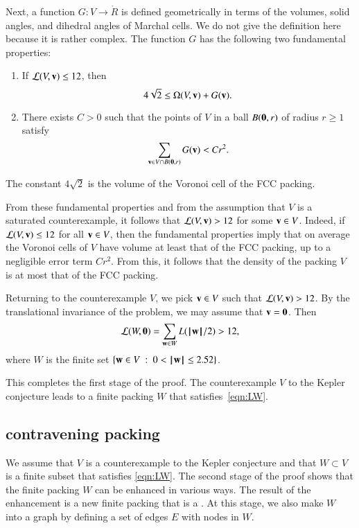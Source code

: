 Next, a function $G:V\to \ring{R}$ is defined geometrically in terms
of the volumes, solid angles, and dihedral angles of Marchal cells.
We do not give the definition here because it is rather
complex.  The function $G$ has the following two fundamental
properties:
\begin{enumerate}
\item If ${\mathcal L}(V,{\mathbf v})\le 12$, then 
\[
4\sqrt{2}\le \Omega(V,{\mathbf v}) +G({\mathbf v}).
\]
\item There exists $C>0$ such that the points of $V$ in a ball $B({\mathbf 0},r)$
of radius $r\ge 1$ satisfy
\[
\sum_{{\mathbf v}\in V \cap B({\mathbf 0},r)} G({\mathbf v}) < C r^2.
\]
\end{enumerate}
The constant $4\sqrt{2}$ is the volume of the Voronoi cell of the FCC packing.

From these fundamental properties and from the assumption that $V$ is a saturated counterexample,
it follows that ${\mathcal L}(V,{\mathbf v})>12$ for some ${\mathbf v}\in V$.  Indeed, if ${\mathcal L}(V,{\mathbf v})\le 12$ for all
${\mathbf v}\in V$, then the fundamental properties
imply that on average the Voronoi cells of $V$ have volume at least that of the FCC packing, up to a negligible error term $C r^2$.  From this, it follows that the density
of the packing $V$ is at most that of the FCC packing.



Returning to the counterexample $V$, we pick ${\mathbf v}\in V$ such that
${\mathcal L}(V,{\mathbf v})>12$.  By the translational invariance of the problem, we
may assume that ${\mathbf v}={\mathbf 0}$.  Then
\begin{equation}\label{eqn:LW}
{\mathcal L}(W,{\mathbf 0}) = \sum_{{\mathbf w}\in W} L({{\hskip0.1em|\hskip-0.15em|\hskip0.1em}{\mathbf w}{\hskip0.1em|\hskip-0.15em|\hskip0.1em}}/2)  > 12,
\end{equation}
where $W$ is the finite set  $\{{\mathbf w}\in V\ :\  0 < {{\hskip0.1em|\hskip-0.15em|\hskip0.1em}{\mathbf w}{\hskip0.1em|\hskip-0.15em|\hskip0.1em}} \le 2.52\}$.

This completes the first stage of the proof.
The counterexample $V$ to the Kepler conjecture leads to a finite packing $W$
that satisfies~\eqref{eqn:LW}.

\subsection{contravening packing}

We assume that $V$ is a counterexample to the Kepler conjecture and
that $W\subset V$ is a finite subset that satisfies \eqref{eqn:LW}.
The second stage of the proof shows that the finite packing $W$ can be
enhanced in various ways.  The result of the enhancement is a new
finite packing that is a .  At this stage, we also make $W$ into a
graph by defining a set of edges $E$ with nodes in $W$.

